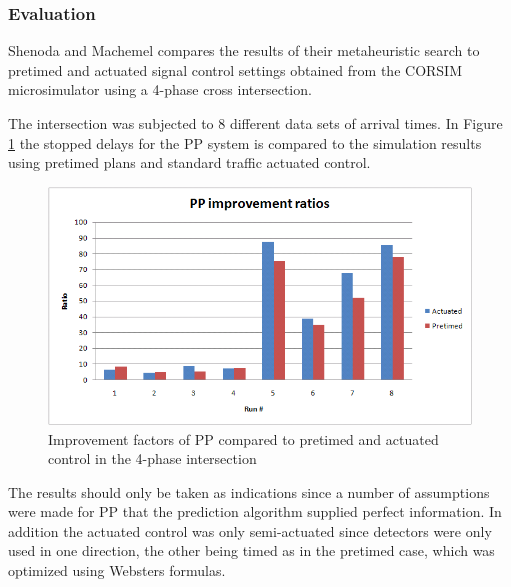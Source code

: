 \subsubsection*{Evaluation}

Shenoda and Machemel compares the results of their metaheuristic
search to pretimed and actuated signal control settings obtained from
the CORSIM microsimulator using a 4-phase cross intersection.


The intersection was subjected to 8 different data sets of arrival
times. In Figure \ref{fig:pp_improvements} the stopped delays for the
PP system is compared to the simulation results using pretimed plans
and standard traffic actuated control.

\begin{figure}[!ht]
\begin{center}
\includegraphics[scale=0.35]{phase-by-phase_improvement_ratios.png} 
\end{center}
\caption{Improvement factors of PP compared to pretimed and actuated control in the 4-phase intersection}
\label{fig:pp_improvements}
\end{figure}

The results should only be taken as indications since a number of
assumptions were made for PP that the prediction algorithm supplied
perfect information. In addition the actuated control was only
semi-actuated since detectors were only used in one direction, the
other being timed as in the pretimed case, which was optimized using
Websters formulas.

